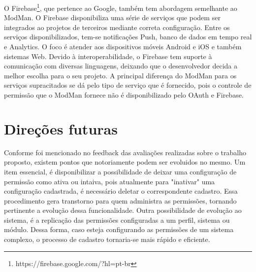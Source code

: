 O Firebase\footnote{https://firebase.google.com/?hl=pt-br}, que pertence ao Google, também tem abordagem semelhante ao ModMan. O Firebase disponibiliza uma série de serviços que podem ser integrados ao projetos de terceiros mediante correta configuração. Entre os serviços disponibilizados, tem-se notificações Push, banco de dados em tempo real e Analytics. O foco é atender aos dispositivos móveis Android e iOS e também sistemas Web. Devido à interoperabilidade, o Firebase tem suporte à comunicação com diversas linguagens, deixando que o desenvolvedor decida a melhor escolha para o seu projeto. A principal diferença do ModMan para os serviços supracitados se dá pelo tipo de serviço que é fornecido, pois o controle de permissão que o ModMan fornece não é disponibilizado pelo OAuth e Firebase.


\section{Direções futuras}\label{direcionamentos}%


Conforme foi mencionado no feedback das avaliações realizadas sobre o trabalho proposto, existem pontos que notoriamente podem ser evoluidos no mesmo. Um item essencial, é disponibilizar a possibilidade de deixar uma configuração de permissão como ativa ou intaiva, pois atualmente para "inativar" uma configuração cadastrada, é necessário deletar o correspondente cadastro. Essa procedimento gera transtorno para quem administra as permissões, tornando pertinente a evolução dessa funcionalidade.
Outra possibilidade de evolução ao sistema, é a replicação das permissões configuradas a um perfil, sistema ou módulo. Dessa forma, caso esteja configurando as permissões de um sistema complexo, o processo de cadastro tornaria-se mais rápido e eficiente.%

